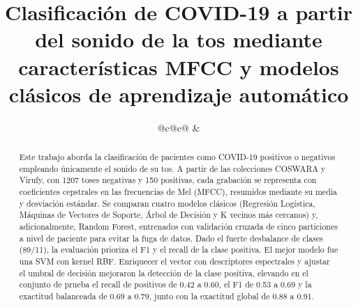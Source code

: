 \documentclass[conference]{IEEEtran}
\begin{document}
\title{Clasificaci\'on de COVID-19 a partir del sonido de la tos mediante caracter\'isticas MFCC y modelos cl\'asicos de aprendizaje autom\'atico}

\author{%
\begin{tabular}{@{}c@{\hspace{3em}}c@{}}
&
\\[1.4em]
\end{tabular}%
}

\maketitle

\begin{abstract}
Este trabajo aborda la clasificaci\'on de pacientes como COVID-19 positivos o negativos empleando \'unicamente el sonido de su tos. A partir de las colecciones COSWARA y Virufy, con 1207 toses negativas y 150 positivas, cada grabaci\'on se representa con coeficientes cepstrales en las frecuencias de Mel (MFCC), resumidos mediante su media y desviaci\'on est\'andar. Se comparan cuatro modelos cl\'asicos (Regresi\'on Log\'istica, M\'aquinas de Vectores de Soporte, \'Arbol de Decisi\'on y K vecinos m\'as cercanos) y, adicionalmente, Random Forest, entrenados con validaci\'on cruzada de cinco particiones a nivel de paciente para evitar la fuga de datos. Dado el fuerte desbalance de clases (89/11), la evaluaci\'on prioriza el F1 y el recall de la clase positiva. El mejor modelo fue una SVM con kernel RBF. Enriquecer el vector con descriptores espectrales y ajustar el umbral de decisi\'on mejoraron la detecci\'on de la clase positiva, elevando en el conjunto de prueba el recall de positivos de 0.42 a 0.60, el F1 de 0.53 a 0.69 y la exactitud balanceada de 0.69 a 0.79, junto con la exactitud global de 0.88 a 0.91.
\end{abstract}
\end{document}
